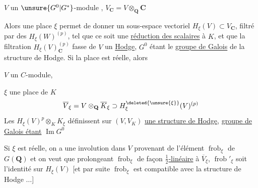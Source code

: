 $V$ un $\unsure{G^0|G^*}$-module , $V_{\mathbf C}=V\otimes_{\mathbf Q}\mathbf C$

Alors une place  $\xi$ permet de donner un sous-espace vectoriel $H_\xi(V)\subset V_{\mathbf C}$, filtré par des $H_\xi(W)^{(p)}$, tel que  ce soit une \uline{réduction des scalaires} à $K$, et que la filtration $H_\xi(V)_{\mathbf C}^{(p)}$ fasse de $V$ un  \uline{Hodge}, $G^0$ étant   le \uline{groupe de Galois} de la structure de Hodge. Si la place est réelle, alors

 $V$ un $C$-module,

$\xi$ une place de $K$
\[
\overline V_\xi=V\otimes_{\mathbf Q}\overline K_\xi\supset H^{\deleted{\unsure{\xi}}}_{\xi}(V)^{(p)}
\]
Les $H_\xi(V)^p\otimes_K K_\xi$ définissent sur $(V,V_K)$ \uline{une structure de Hodge},  \uline{groupe de Galois étant}  \uline{ $\operatorname{Im}G^0$}

Si $\xi$ est réelle, on a une involution dans $V$ provenant de l'élément  $\operatorname{frob}_\xi$ de $G(\mathbf Q)$ et on veut que prolongeant $\operatorname{frob}_\xi$ de façon \uline{$\frac12$-linéaire} à $\overline V_\xi$, $\operatorname{frob}'_\xi$ soit l'identité sur $H_\xi(V)$ [et par suite $\operatorname{frob}_\xi$ est compatible avec la structure de Hodge $\ldots$]
